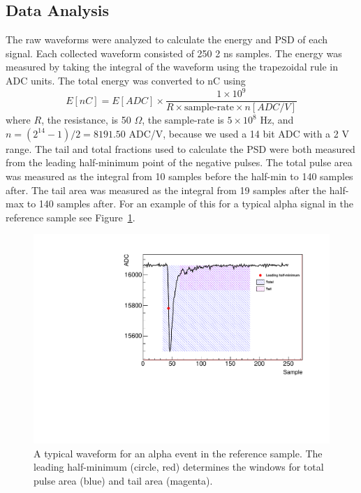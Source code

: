 \subsection{Data Analysis}

The raw waveforms were analyzed to calculate the energy and PSD of each signal. 
Each collected waveform consisted of 250 2 ns samples.
The energy was measured by taking the integral of the waveform using the trapezoidal rule in ADC units.
The total energy was converted to nC using
\begin{equation}
E[nC] = E[ADC] \times \frac{1\times10^9}{R\times\textrm{sample-rate}\times n[ADC/V]}
\end{equation}
where $R$, the resistance, is 50 $\Omega$, the sample-rate is $5\times10^8$ Hz, and $n = (2^{14} -1)/2 = 8191.50$ ADC/V, because we used a 14 bit ADC with a 2 V range.
The tail and total fractions used to calculate the PSD were both measured from the leading half-minimum point of the negative pulses.
The total pulse area was measured as the integral from 10 samples before the half-min to 140 samples after.
The tail area was measured as the integral from 19 samples after the half-max to 140 samples after.
For an example of this for a typical alpha signal in the reference sample see Figure~\ref{fig:waveformbnl}.

\begin{figure}[!t]
	\centering
	\includegraphics[width=0.6\linewidth]{tex/6-ac227-images/BNL/Waveform_BNL}
	\caption{A typical waveform for an alpha event in the reference sample. The leading half-minimum (circle, red) determines the windows for total pulse area (blue) and tail area (magenta).}
	\label{fig:waveformbnl}
\end{figure}


